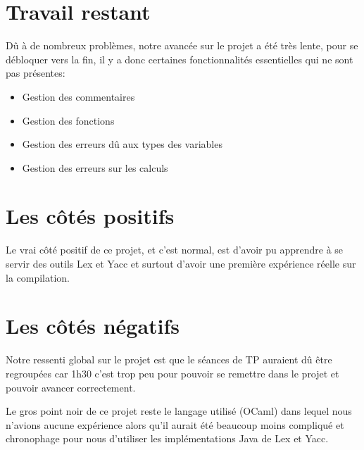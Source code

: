 \section{Travail restant}

Dû à de nombreux problèmes, notre avancée sur le projet a été très lente, pour se débloquer vers la fin, il y a donc certaines fonctionnalités essentielles qui ne sont pas présentes:

\begin{itemize}
    \item Gestion des commentaires
    \item Gestion des fonctions
    \item Gestion des erreurs dû aux types des variables
    \item Gestion des erreurs sur les calculs
\end{itemize}

\section{Les côtés positifs}

Le vrai côté positif de ce projet, et c'est normal, est d'avoir pu apprendre à se servir des outils Lex et Yacc et surtout d'avoir une première expérience réelle sur la compilation.

\section{Les côtés négatifs}

Notre ressenti global sur le projet est que le séances de TP auraient dû être regroupées car 1h30 c'est trop peu pour pouvoir se remettre dans le projet et pouvoir avancer correctement.

Le gros point noir de ce projet reste le langage utilisé (OCaml) dans lequel nous n'avions aucune expérience alors qu'il aurait été beaucoup moins compliqué et chronophage pour nous d'utiliser les implémentations Java de Lex et Yacc.